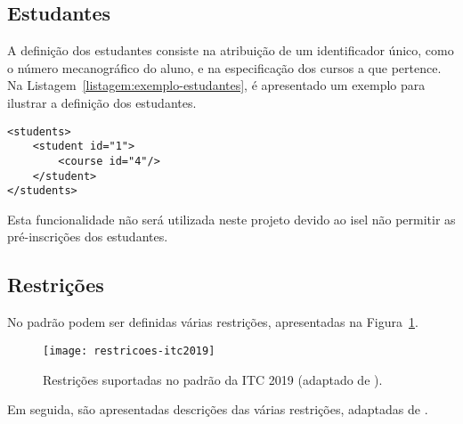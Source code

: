 
\subsection{Estudantes}

A definição dos estudantes consiste na atribuição de um identificador único, como o número mecanográfico do aluno, e na especificação dos cursos a que pertence. Na Listagem~\ref{listagem:exemplo-estudantes}, é apresentado um exemplo para ilustrar a definição dos estudantes.

\begin{minipage}[c]{\linewidth}
\begin{lstlisting}[caption={Exemplo da definição dos estudantes.}, label={listagem:exemplo-estudantes}]
<students>
    <student id="1">
        <course id="4"/>
    </student>
</students>
\end{lstlisting}
\end{minipage}

Esta funcionalidade não será utilizada neste projeto devido ao \gls{isel} não permitir as pré-inscrições dos estudantes.

\subsection{Restrições}

No padrão podem ser definidas várias restrições, apresentadas na Figura~\ref{fig:restricoes-itc2019}.

\begin{figure}[ht]
    \centering
    \texttt{[image: restricoes-itc2019]}
    \caption{Restrições suportadas no padrão da ITC 2019 (adaptado de \cite{itc2019-Website}).}
    \label{fig:restricoes-itc2019}
\end{figure}

Em seguida, são apresentadas descrições das várias restrições, adaptadas de \cite{itc2019-Website}.

